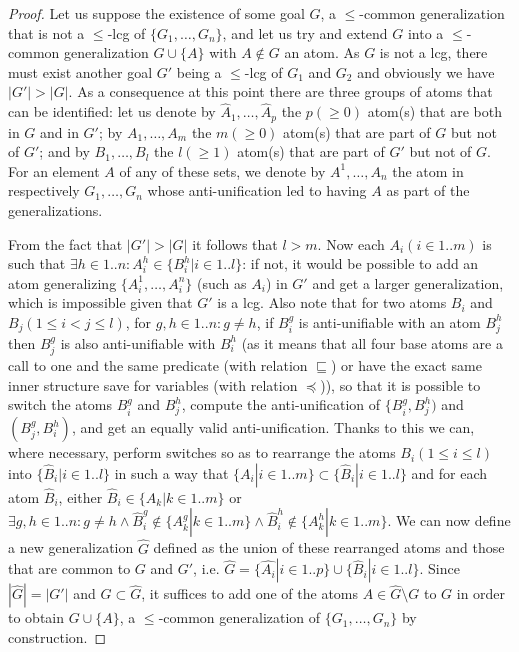 	
		\begin{proof}
		
		Let us suppose the existence of some goal $G$, a $\leqslant$-common generalization that is not a $\leqslant$-lcg of $\{G_1, \dots, G_n\}$, and let us try and extend $G$ into a $\leqslant$-common generalization $G\cup\{A\}$ with $A\notin G$ an atom. As $G$ is not a lcg, there must exist another goal $G'$ being a $\leqslant$-lcg of $G_1$ and $G_2$ and obviously we have $|G'|>|G|$. As a consequence at this point there are three groups of atoms that can be identified: let us denote by $\hat{A}_1, \dots, \hat{A}_p$ the $p (\ge 0)$ atom(s) that are both in $G$ and in $G'$; by $A_1, \dots, A_m$ the $m (\ge 0)$ atom(s) that are part of $G$ but not of $G'$; and by $B_1, \dots, B_l$ the $l (\ge 1)$ atom(s) that are part of $G'$ but not of $G$. For an element $A$ of any of these sets, we denote by $A^1, \dots, A_n$ the atom in respectively $G_1, \dots, G_n$ whose anti-unification led to having $A$ as part of the generalizations.
		
		From the fact that $|G'|>|G|$ it follows that $l>m$. Now each $A_i (i \in 1..m)$ is such that $\exists  h\in 1..n : A_i^h\in \{B_i^h|i\in 1..l\}$: if not, it would be possible to add an atom generalizing $\{A_i^1, \dots, A_i^n\}$ (such as $A_i$) in $G'$ and get a larger generalization, which is impossible given that $G'$ is a lcg. Also note that for two atoms $B_i$ and $B_j (1\le i < j \le l)$, for $g, h \in 1..n : g\neq h$, if $B_i^g$ is anti-unifiable with an atom $B_j^h$ then $B_j^g$ is also anti-unifiable with $B_i^h$ (as it means that all four base atoms are a call to one and the same predicate (with relation $\sqsubseteq$) or have the exact same inner structure save for variables (with relation $\preceq$)), so that it is possible to switch the atoms $B_i^g$ and $B_j^h$, compute the anti-unification of $\{B_i^g, B_j^h)$ and $(B_j^g, B_i^h)$, and get an equally valid anti-unification. Thanks to this we can, where necessary, perform switches so as to rearrange the atoms $B_i (1\le i \le l)$ into $\{\hat{B}_i|i \in 1..l\}$ in such a way that $\{A_i|i\in 1..m\} \subset \{\hat{B}_i|i \in 1..l\}$ and for each atom $\hat{B}_i$, either $\hat{B}_i \in \{A_k|k\in 1..m\}$ or $\exists g, h \in 1..n : g\neq h \wedge \hat{B}_i^g\notin \{A_k^g|k\in 1..m\}\wedge \hat{B}_i^h\notin \{A_k^h|k\in 1..m\}$. We can now define a new generalization $\hat{G}$ defined as the union of these rearranged atoms and those that are common to $G$ and $G'$, i.e. $\hat{G} = \{\hat{A_i}|i\in 1..p\}\cup\{\hat{B}_i|i\in 1..l\}$. Since $|\hat{G}| = |G'|$ and $G\subset \hat{G}$, it suffices to add one of the atoms $A \in \hat{G}\setminus G$ to $G$ in order to obtain $G\cup\{A\}$, a $\leqslant$-common generalization of $\{G_1, \dots, G_n\}$ by construction.
	\end{proof}


